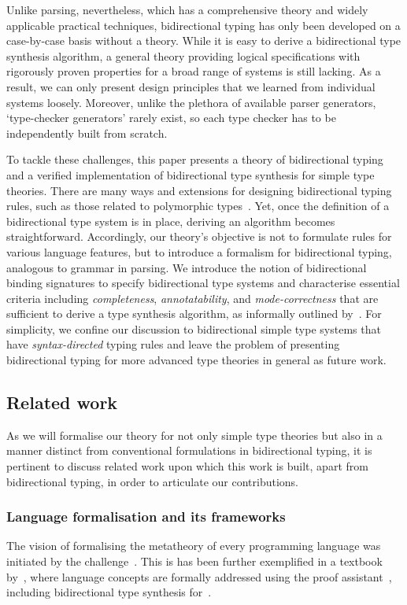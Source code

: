 Unlike parsing, nevertheless, which has a comprehensive theory and widely applicable practical techniques, bidirectional typing has only been developed on a case-by-case basis without a theory.
While it is easy to derive a bidirectional type synthesis algorithm, a general theory providing logical specifications with rigorously proven properties for a broad range of systems is still lacking.
As a result, we can only present design principles that we learned from individual systems loosely.
Moreover, unlike the plethora of available parser generators, `type-checker generators' rarely exist, so each type checker has to be independently built from scratch.

To tackle these challenges, this paper presents a theory of bidirectional typing and a verified implementation of bidirectional type synthesis for simple type theories.
There are many ways and extensions for designing bidirectional typing rules, such as those related to polymorphic types~\citep{Pierce2000,Peyton-Jones2007,Dunfield2013,Xie2018}.
Yet, once the definition of a bidirectional type system is in place, deriving an algorithm becomes straightforward.
Accordingly, our theory's objective is not to formulate rules for various language features, but to introduce a formalism for bidirectional typing, analogous to grammar in parsing.
We introduce the notion of bidirectional binding signatures to specify bidirectional type systems and characterise essential criteria including \emph{completeness}, \emph{annotatability}, and \emph{mode-correctness} that are sufficient to derive a type synthesis algorithm, as informally outlined by~\citet{Dunfield2021}.
For simplicity, we confine our discussion to bidirectional simple type systems that have \emph{syntax-directed} typing rules and leave the problem of presenting bidirectional typing for more advanced type theories in general as future work.

\subsection{Related work}\label{sec:related-work}
As we will formalise our theory for not only simple type theories but also in a manner distinct from conventional formulations in bidirectional typing, it is pertinent to discuss related work upon which this work is built, apart from bidirectional typing, in order to articulate our contributions.

\subsubsection{Language formalisation and its frameworks} \label{sec:language-formalisation}
The vision of formalising the metatheory of every programming language was initiated by the \PoplMark challenge~\citep{Aydemir2005}.
This is has been further exemplified in a textbook by~\citet{Wadler2022}, where language concepts are formally addressed using the proof assistant~\Agda, including bidirectional type synthesis for~\PCF.

